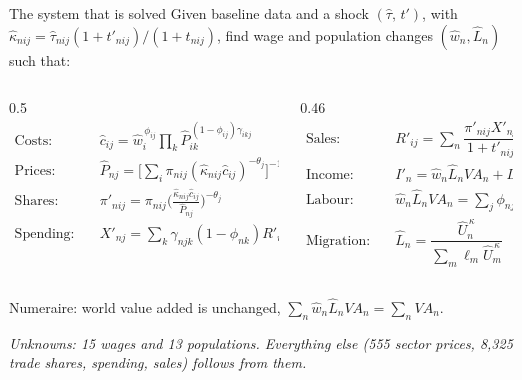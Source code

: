 \documentclass[aspectratio=169,9pt,t]{beamer}
\newcommand{\h}[1]{\hat{#1}}
\newcommand{\plain}[1]{{\color{ipgrey}\small\itshape #1}}
\begin{document}
\begin{frame}{The system that is solved}
  Given baseline data and a shock $(\h\tau,\,t')$, with
  $\h\kappa_{nij}=\h\tau_{nij}(1+t'_{nij})/(1+t_{nij})$, find wage and
  population changes $(\h w_n,\h L_n)$ such that:
  \small
  \begin{columns}[T]
    \begin{column}{0.5\textwidth}
      \begin{align*}
        \text{Costs:}\quad & \h c_{ij}=\h w_i^{\,\phi_{ij}}\textstyle\prod_k\h P_{ik}^{\,(1-\phi_{ij})\gamma_{ikj}}\\[0.3em]
        \text{Prices:}\quad & \h P_{nj}=\Big[\textstyle\sum_i\pi_{nij}(\h\kappa_{nij}\h c_{ij})^{-\theta_j}\Big]^{-1/\theta_j}\\[0.3em]
        \text{Shares:}\quad & \pi'_{nij}=\pi_{nij}\Big(\frac{\h\kappa_{nij}\h c_{ij}}{\h P_{nj}}\Big)^{-\theta_j}\\[0.3em]
        \text{Spending:}\quad & X'_{nj}=\textstyle\sum_k\gamma_{njk}(1-\phi_{nk})R'_{nk}+\beta_{nj}I'_n
      \end{align*}
    \end{column}
    \begin{column}{0.46\textwidth}
      \begin{align*}
        \text{Sales:}\quad & R'_{ij}=\textstyle\sum_n\dfrac{\pi'_{nij}X'_{nj}}{1+t'_{nij}}\\[0.3em]
        \text{Income:}\quad & I'_n=\h w_n\h L_nVA_n+D_n+T'_n\\[0.3em]
        \text{Labour:}\quad & \h w_n\h L_nVA_n=\textstyle\sum_j\phi_{nj}R'_{nj}\\[0.3em]
        \text{Migration:}\quad & \h L_n=\dfrac{\h U_n^{\,\kappa}}{\sum_m\ell_m\h U_m^{\,\kappa}}
      \end{align*}
    \end{column}
  \end{columns}
  \normalsize
  \medskip
  Numeraire: world value added is unchanged, $\sum_n\h w_n\h L_nVA_n=\sum_nVA_n$.

  \medskip
  \plain{Unknowns: 15 wages and 13 populations. Everything else (555 sector
  prices, 8,325 trade shares, spending, sales) follows from them.}
\end{frame}
\end{document}
